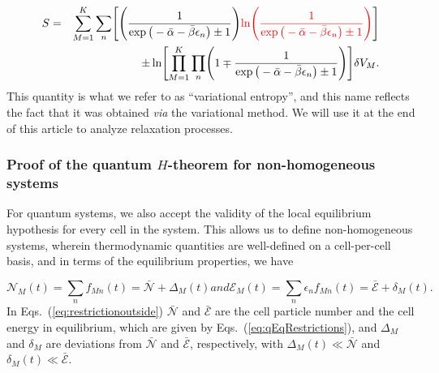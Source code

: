 %
\begin{eqnarray}\label{eq:varEntropyDef}
      S&=&\sum_{M=1}^{K}
        \sum_n  \left[
        		\left(\frac{1}{\exp\big(-\bar{\alpha}-\bar{\beta}\epsilon_{n}\big)\pm 1} \right)
           \commr{\ln \left(\frac{1}{\exp\big(-\bar{\alpha}-\bar{\beta}\epsilon_{n}\big)\pm 1} \right)}
         \right]\nonumber \\
      &&\quad\pm  \ln \left[\prod_{M=1}^{K} \prod_{n}
         \left(1 \mp \frac{1}{\exp\big(-\bar{\alpha}-\bar{\beta}\epsilon_{n}\big)\pm 1} \right)
         \right] \delta V_M.
\end{eqnarray}
%
This quantity is what we refer to as ``variational entropy'',
and this name reflects the fact that it was obtained \textit{via}
the variational method. {\color{blue} We will use it at the end of this article to analyze relaxation processes.}

\subsubsection{Proof of the quantum $H$-theorem for non-homogeneous systems}

For quantum systems, we also accept the validity of the local equilibrium hypothesis
for every cell in the system. This allows us to define non-homogeneous systems,
wherein thermodynamic quantities are well-defined on a cell-per-cell basis,
and in terms of the equilibrium properties, we have

%
\begin{subequations}\label{eq:restrictionoutside}
\begin{equation}
        \mathcal{N}_M(t)=\sum_{n}f_{Mn}(t)=\bar{\mathcal{N}}+\Delta_M(t) 
\end{equation}
  and
\begin{equation}
        \mathcal{E}_M(t)=\sum_{n}\epsilon_{n}f_{Mn}(t)=\bar{\mathcal{E}}+ \delta_M(t).
\end{equation}
\end{subequations}
%
In Eqs.~(\ref{eq:restrictionoutside}) $\bar {\mathcal{N}}$ and $\bar{\mathcal{E}}$ are the cell particle
number and the cell energy in equilibrium, which are given by Eqs.~(\ref{eq:qEqRestrictions}),
and $\Delta_M$ and $\delta_M$ are deviations from $\bar{\mathcal{N}}$
and $\bar{\mathcal{E}}$, respectively, with $\Delta_M(t)\ll \bar{\mathcal{N}}$
and $\delta_M(t) \ll \bar{\mathcal{E}}$. 



